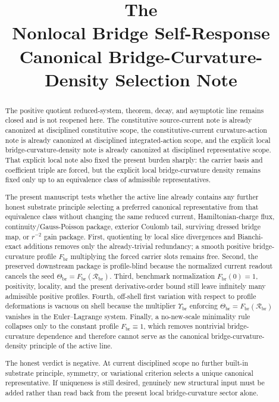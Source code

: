 \documentclass[11pt]{article}
\title{\textbf{The \TheoryName{}}\\[0.4em]
\large Nonlocal Bridge Self-Response Canonical Bridge-Curvature-Density Selection Note}
\author{}
\date{}
\newcommand{\CurvSeed}{\Theta_{\mathrm{br}}}
\newcommand{\CurvSeedMult}{\Upsilon_{\mathrm{br}}}
\newcommand{\CurvProfile}{F_{\mathrm{br}}}
\newcommand{\BridgeCurv}{\mathcal R_{\mathrm{br}}}
\begin{document}
\maketitle

\begin{abstract}
The positive quotient reduced-system, theorem, decay, and asymptotic line remains closed and is not reopened here. The constitutive source-current note is already canonized at disciplined constitutive scope, the constitutive-current curvature-action note is already canonized at disciplined integrated-action scope, and the explicit local bridge-curvature-density note is already canonized at disciplined representative scope. That explicit local note also fixed the present burden sharply: the carrier basis and coefficient triple are forced, but the explicit local bridge-curvature density remains fixed only up to an equivalence class of admissible representatives.

The present manuscript tests whether the active line already contains any further honest substrate principle selecting a preferred canonical representative from that equivalence class without changing the same reduced current, Hamiltonian-charge flux, continuity/Gauss-Poisson package, exterior Coulomb tail, surviving dressed bridge map, or \(r^{-2}\) gain package. First, quotienting by local slice divergences and Bianchi-exact additions removes only the already-trivial redundancy; a smooth positive bridge-curvature profile \(\CurvProfile\) multiplying the forced carrier slots remains free. Second, the preserved downstream package is profile-blind because the normalized current readout cancels the seed \(\CurvSeed=\CurvProfile(\BridgeCurv)\). Third, benchmark normalization \(\CurvProfile(0)=1\), positivity, locality, and the present derivative-order bound still leave infinitely many admissible positive profiles. Fourth, off-shell first variation with respect to profile deformations is vacuous on shell because the multiplier \(\CurvSeedMult\) enforcing \(\CurvSeed=\CurvProfile(\BridgeCurv)\) vanishes in the Euler--Lagrange system. Finally, a no-new-scale minimality rule collapses only to the constant profile \(\CurvProfile\equiv1\), which removes nontrivial bridge-curvature dependence and therefore cannot serve as the canonical bridge-curvature-density principle of the active line.

The honest verdict is negative. At current disciplined scope no further built-in substrate principle, symmetry, or variational criterion selects a unique canonical representative. If uniqueness is still desired, genuinely new structural input must be added rather than read back from the present local bridge-curvature sector alone.
\end{abstract}
\end{document}
